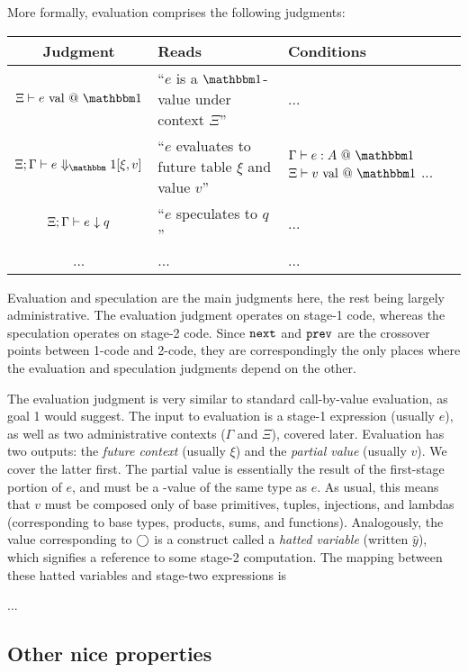 More formally, evaluation comprises the following judgments:

\begin{center}
\begin{tabular}{|c|p{2.5cm}|p{2.5cm}|} \hline
Judgment & Reads & Conditions \\ \hline 
$\isvalone e$ & ``$e$ is a $\bbone$-value under context $\Xi$'' & ... \\ \hline 
$\diaonesub$ & ``$e$ evaluates to future table $\xi$ and value $v$'' 
& $\typesone e A$ 
	\newline $\isvalone v$ 
	\newline ... \\ \hline 
${\Xi;\Gamma} \vdash {e_{}} \downarrow {q_{}}$ & ``$e$ speculates to $q$'' & ... \\ \hline 
...&...&... \\ \hline
\end{tabular}
\end{center}

Evaluation and speculation are the main judgments here, the rest being largely administrative.  The evaluation judgment operates on stage-1 code, whereas the speculation operates on stage-2 code.  Since ${\tt next}$ and ${\tt prev}$ are the crossover points between 1-code and 2-code, they are correspondingly the only places where the evaluation and speculation judgments depend on the other. 


The evaluation judgment is very similar to standard call-by-value evaluation, as goal 1 would suggest.  The input to evaluation is a stage-1 expression (usually $e$), as well as two administrative contexts ($\Gamma$ and $\Xi$), covered later.  Evaluation has two outputs: the {\em future context} (usually $\xi$) and the {\em partial value} (usually $v$).  We cover the latter first.  The partial value is essentially the result of the first-stage portion of $e$, and must be a \bbone-value of the same type as $e$.  As usual, this means that $v$ must be composed only of base primitives, tuples, injections, and lambdas (corresponding to base types, products, sums, and functions).  Analogously, the value corresponding to $\bigcirc$ is a construct called a {\em hatted variable} (written $\hat y$), which signifies a reference to some stage-2 computation.  The mapping between these hatted variables and stage-two expressions is

...

\subsection{Other nice properties}

